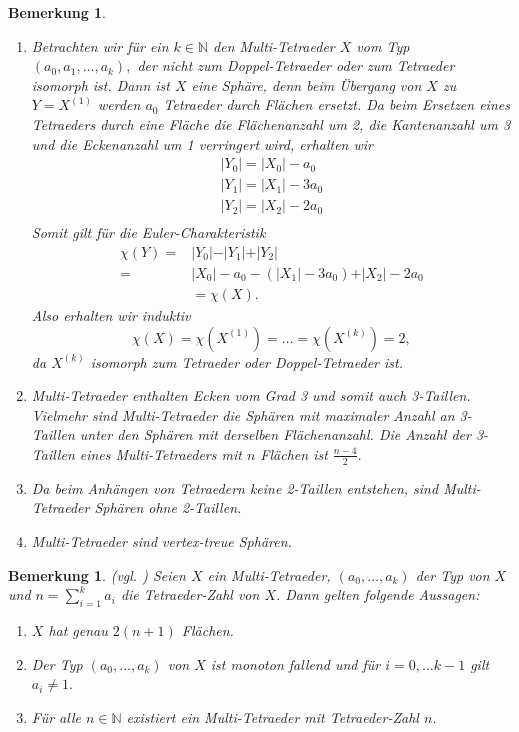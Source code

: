 \documentclass[12pt,titlepage,twoside,cleardoublepage]{article}
\theoremstyle{nummermitklammern}
\newtheorem{bemerkung}[temp]{Bemerkung}
\newtheorem{bemerkung}[zahl]{Bemerkung}
\numberwithin{equation}{section}
\begin{document}
\begin{bemerkung}
\begin{enumerate}
\item Betrachten wir für ein $k\in \mathbb{N}$ den Multi-Tetraeder $X$ vom Typ $(a_0,a_1,\ldots,a_k),$ der nicht zum Doppel-Tetraeder oder zum Tetraeder isomorph ist. Dann ist $X$ eine Sphäre, denn beim Übergang von $X$ zu $Y=X^{(1)}$ werden $a_0$ Tetraeder durch Flächen ersetzt. Da beim Ersetzen eines Tetraeders durch eine Fläche die Flächenanzahl um 2, die Kantenanzahl um 3 und die Eckenanzahl um 1 verringert wird, erhalten wir  
\begin{align*}
\vert Y_0\vert =\vert X_0\vert-a_0\\
\vert Y_1\vert=\vert X_1\vert-3a_0\\
\vert Y_2\vert=\vert X_2\vert-2a_0\\
\end{align*}
Somit gilt für die Euler-Charakteristik
\begin{align*}
\chi(Y)=&\vert Y_0\vert -\vert Y_1\vert+\vert Y_2\vert\\
=&\vert X_0\vert-a_0-(\vert X_1\vert-3a_0)+\vert X_2\vert-2a_0\\
&=\chi (X).
\end{align*}
Also erhalten wir induktiv 
\[
\chi(X)=\chi(X^{(1)})=\ldots=\chi(X^{(k)})=2,
\]
da $X^{(k)}$ isomorph zum Tetraeder oder Doppel-Tetraeder ist.
\item Multi-Tetraeder enthalten Ecken vom Grad 3 und somit auch 3-Taillen. Vielmehr sind Multi-Tetraeder die Sphären mit maximaler Anzahl an 3-Taillen unter den Sphären mit derselben Flächenanzahl. Die Anzahl der 3-Taillen eines Multi-Tetraeders mit $n$ Flächen ist $\frac{n-4}{2}.$

\item
Da beim Anhängen von Tetraedern keine 2-Taillen entstehen, sind Multi-Tetraeder Sphären ohne 2-Taillen.
\item
Multi-Tetraeder sind vertex-treue Sphären.
\end{enumerate}
\end{bemerkung}
\begin{bemerkung}{\textsc{(}vgl. \textsc{\cite{simp})}}
Seien $X$ ein Multi-Tetraeder, $(a_0,\ldots,a_k)$ der Typ von $X$ und $n=\sum_{i=1}^{k}a_i$ die Tetraeder-Zahl von $X$. Dann gelten folgende Aussagen: 
\begin{enumerate}
\item $X$ hat genau $2(n+1)$ Flächen. 
\item Der Typ $(a_0,\ldots,a_k)$ von $X$ ist monoton fallend und für $i=0,\ldots k-1$ gilt $a_i\neq 1.$
\item  Für alle $n \in \mathbb{N}$ existiert ein Multi-Tetraeder mit Tetraeder-Zahl $n$.
\end{enumerate}
\end{bemerkung}
\end{document}
